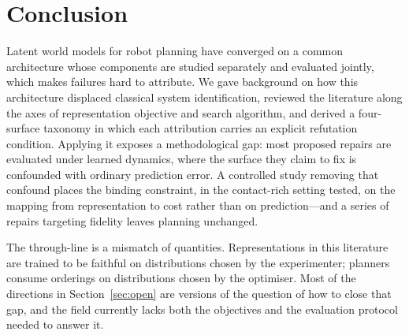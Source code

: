 \documentclass[11pt,letterpaper]{article}
\begin{document}
\section{Conclusion}\label{sec:conclusion}

Latent world models for robot planning have converged on a common architecture
whose components are studied separately and evaluated jointly, which makes
failures hard to attribute. We gave background on how this architecture displaced
classical system identification, reviewed the literature along the axes of
representation objective and search algorithm, and derived a four-surface
taxonomy in which each attribution carries an explicit refutation condition.
Applying it exposes a methodological gap: most proposed repairs are evaluated
under learned dynamics, where the surface they claim to fix is confounded with
ordinary prediction error. A controlled study removing that confound places the
binding constraint, in the contact-rich setting tested, on the mapping from
representation to cost rather than on prediction---and a series of repairs
targeting fidelity leaves planning unchanged.

The through-line is a mismatch of quantities. Representations in this literature
are trained to be faithful on distributions chosen by the experimenter; planners
consume orderings on distributions chosen by the optimiser. Most of the
directions in Section~\ref{sec:open} are versions of the question of how to close
that gap, and the field currently lacks both the objectives and the evaluation
protocol needed to answer it.



\end{document}
